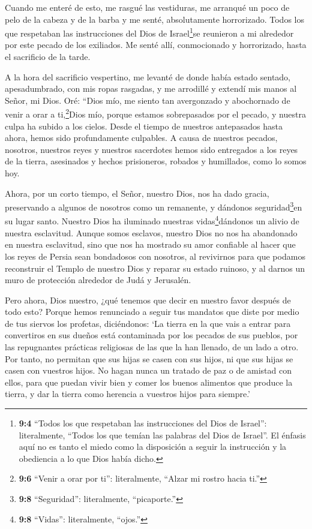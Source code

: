  Cuando me enteré de esto, me rasgué las vestiduras, me
arranqué un poco de pelo de la cabeza y de la barba y me senté,
absolutamente horrorizado.  Todos los que respetaban las
instrucciones del Dios de Israel\footnote{\textbf{9:4} ``Todos los que
  respetaban las instrucciones del Dios de Israel'': literalmente,
  ``Todos los que temían las palabras del Dios de Israel''. El énfasis
  aquí no es tanto el miedo como la disposición a seguir la instrucción
  y la obediencia a lo que Dios había dicho.}se reunieron a mi alrededor
por este pecado de los exiliados. Me senté allí, conmocionado y
horrorizado, hasta el sacrificio de la tarde.

 A la hora del sacrificio vespertino, me levanté de donde
había estado sentado, apesadumbrado, con mis ropas rasgadas, y me
arrodillé y extendí mis manos al Señor, mi Dios.  Oré:
``Dios mío, me siento tan avergonzado y abochornado de venir a orar a
ti,\footnote{\textbf{9:6} ``Venir a orar por ti'': literalmente, ``Alzar
  mi rostro hacia ti.''}Dios mío, porque estamos sobrepasados por el
pecado, y nuestra culpa ha subido a los cielos.  Desde el
tiempo de nuestros antepasados hasta ahora, hemos sido profundamente
culpables. A causa de nuestros pecados, nosotros, nuestros reyes y
nuestros sacerdotes hemos sido entregados a los reyes de la tierra,
asesinados y hechos prisioneros, robados y humillados, como lo somos
hoy.

 Ahora, por un corto tiempo, el Señor, nuestro Dios, nos ha
dado gracia, preservando a algunos de nosotros como un remanente, y
dándonos seguridad\footnote{\textbf{9:8} ``Seguridad'': literalmente,
  ``picaporte.''}en su lugar santo. Nuestro Dios ha iluminado nuestras
vidas\footnote{\textbf{9:8} ``Vidas'': literalmente, ``ojos.''}dándonos
un alivio de nuestra esclavitud.  Aunque somos esclavos,
nuestro Dios no nos ha abandonado en nuestra esclavitud, sino que nos ha
mostrado su amor confiable al hacer que los reyes de Persia sean
bondadosos con nosotros, al revivirnos para que podamos reconstruir el
Templo de nuestro Dios y reparar su estado ruinoso, y al darnos un muro
de protección alrededor de Judá y Jerusalén.

 Pero ahora, Dios nuestro, ¿qué tenemos que decir en
nuestro favor después de todo esto? Porque hemos renunciado a seguir tus
mandatos  que diste por medio de tus siervos los profetas,
diciéndonos: `La tierra en la que vais a entrar para convertiros en sus
dueños está contaminada por los pecados de sus pueblos, por las
repugnantes prácticas religiosas de las que la han llenado, de un lado a
otro.  Por tanto, no permitan que sus hijas se casen con
sus hijos, ni que sus hijas se casen con vuestros hijos. No hagan nunca
un tratado de paz o de amistad con ellos, para que puedan vivir bien y
comer los buenos alimentos que produce la tierra, y dar la tierra como
herencia a vuestros hijos para siempre.'

